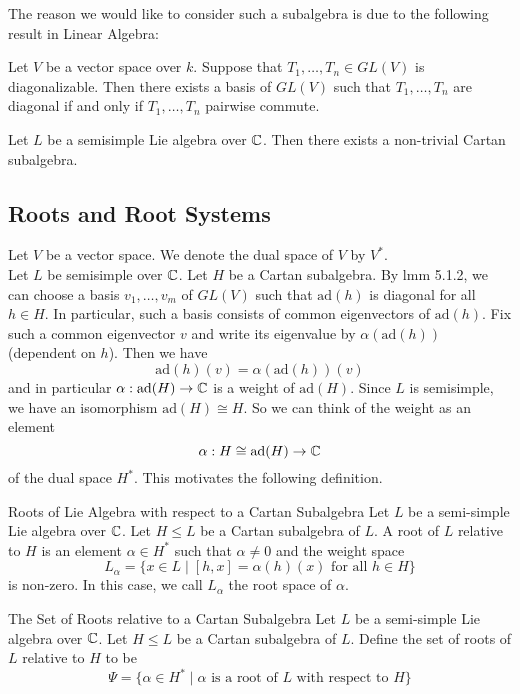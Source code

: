 \documentclass[a4paper]{article}
\begin{document}
The reason we would like to consider such a subalgebra is due to the following result in Linear Algebra: 

\begin{lmm}{}{} Let $V$ be a vector space over $k$. Suppose that $T_1,\dots,T_n\in GL(V)$ is diagonalizable. Then there exists a basis of $GL(V)$ such that $T_1,\dots,T_n$ are diagonal if and only if $T_1,\dots,T_n$ pairwise commute. 
\end{lmm}

\begin{lmm}{}{} Let $L$ be a semisimple Lie algebra over $\mathbb{C}$. Then there exists a non-trivial Cartan subalgebra. 
\end{lmm}

\subsection{Roots and Root Systems}
Let $V$ be a vector space. We denote the dual space of $V$ by $V^\ast$. \\

Let $L$ be semisimple over $\mathbb{C}$. Let $H$ be a Cartan subalgebra. By lmm 5.1.2, we can choose a basis $v_1,\dots,v_m$ of $GL(V)$ such that $\text{ad}(h)$ is diagonal for all $h\in H$. In particular, such a basis consists of common eigenvectors of $\text{ad}(h)$. Fix such a common eigenvector $v$ and write its eigenvalue by $\alpha(\text{ad}(h))$ (dependent on $h$). Then we have $$\text{ad}(h)(v)=\alpha(\text{ad}(h))(v)$$ and in particular $\alpha:\text{ad}(H)\to\mathbb{C}$ is a weight of $\text{ad}(H)$. Since $L$ is semisimple, we have an isomorphism $\text{ad}(H)\cong H$. So we can think of the weight as an element $$\alpha:H\cong\text{ad}(H)\to\mathbb{C}$$ of the dual space $H^\ast$. This motivates the following definition. 

\begin{defn}{Roots of Lie Algebra with respect to a Cartan Subalgebra}{} Let $L$ be a semi-simple Lie algebra over $\mathbb{C}$. Let $H\leq L$ be a Cartan subalgebra of $L$. A root of $L$ relative to $H$ is an element $\alpha\in H^\ast$ such that $\alpha\neq 0$ and the weight space $$L_\alpha=\{x\in L\;|\;[h,x]=\alpha(h)(x)\text{ for all }h\in H\}$$ is non-zero. In this case, we call $L_\alpha$ the root space of $\alpha$. 
\end{defn}

\begin{defn}{The Set of Roots relative to a Cartan Subalgebra}{} Let $L$ be a semi-simple Lie algebra over $\mathbb{C}$. Let $H\leq L$ be a Cartan subalgebra of $L$. Define the set of roots of $L$ relative to $H$ to be $$\Psi=\{\alpha\in H^\ast\;|\;\alpha\text{ is a root of }L\text{ with respect to }H\}$$
\end{defn}
\end{document}
